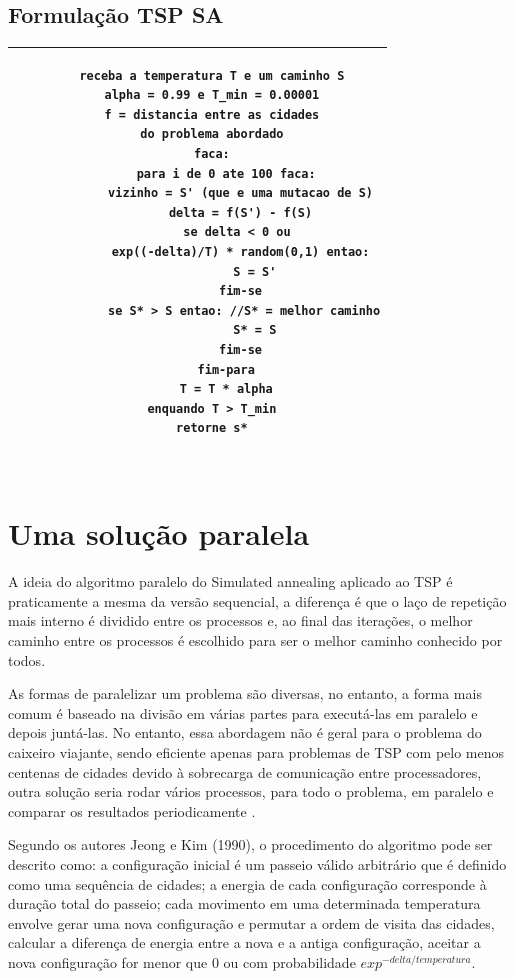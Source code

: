 \documentclass[journal]{IEEEtran}
\begin{document}
\subsection{Formulação TSP SA}
\label{formulacao_seqsatsp}
\begin{table}[H]
    \centering
    \begin{tabular}{|c|}\hline
     \begin{lstlisting} 
    receba a temperatura T e um caminho S
    alpha = 0.99 e T_min = 0.00001
    f = distancia entre as cidades
    do problema abordado
    faca:
        para i de 0 ate 100 faca:
            vizinho = S' (que e uma mutacao de S)
            delta = f(S') - f(S)
            se delta < 0 ou 
            exp((-delta)/T) * random(0,1) entao:
                S = S'
            fim-se
             se S* > S entao: //S* = melhor caminho
                S* = S
            fim-se
        fim-para
        T = T * alpha
    enquando T > T_min
    retorne s*
    
\end{lstlisting} \\
         \hline
    \end{tabular}
    \label{tab:pseudo_seq}
\end{table}

\section{Uma solução paralela}
A ideia do algoritmo paralelo do Simulated annealing aplicado ao TSP é praticamente a mesma da versão sequencial, a diferença é que o laço de repetição mais interno é dividido entre os processos e, ao final das iterações, o melhor caminho entre os processos é escolhido para ser o melhor caminho conhecido por todos.

As formas de paralelizar um problema são diversas, no entanto, a forma mais comum é baseado na divisão em várias partes para executá-las em paralelo e depois juntá-las. No entanto, essa abordagem não é geral para o problema do caixeiro viajante, sendo eficiente apenas para problemas de TSP com pelo menos centenas de cidades devido à sobrecarga de comunicação entre processadores, outra solução seria rodar vários processos, para todo o problema, em paralelo e comparar os resultados periodicamente \cite{MALEK}. 


Segundo os autores Jeong e Kim (1990), o procedimento do algoritmo pode ser descrito como: a configuração inicial é um passeio válido arbitrário que é definido como uma sequência de cidades; a energia de cada configuração corresponde à duração total do passeio; cada movimento em uma determinada temperatura envolve gerar uma nova configuração e permutar a ordem de visita das cidades, calcular a diferença de energia entre a nova e a antiga configuração, aceitar a nova configuração for menor que 0 ou com probabilidade $exp^{-delta/temperatura}$.
\end{document}
